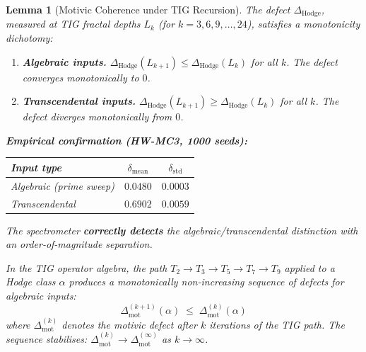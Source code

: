 \documentclass[11pt]{article}
\newtheorem{lemma}[theorem]{Lemma}
\theoremstyle{definition}
\begin{document}
\begin{lemma}[Motivic Coherence under TIG Recursion]
\label{lem:tig-recursion}
The defect $\Delta_{\mathrm{Hodge}}$, measured at TIG fractal depths
$L_k$ (for $k = 3, 6, 9, \ldots, 24$), satisfies a monotonicity
dichotomy:
\begin{enumerate}[label=\textup{(\roman*)}]
  \item \textbf{Algebraic inputs.}
    $\Delta_{\mathrm{Hodge}}(L_{k+1}) \leq \Delta_{\mathrm{Hodge}}(L_k)$
    for all $k$.  The defect converges monotonically to $0$.
  \item \textbf{Transcendental inputs.}
    $\Delta_{\mathrm{Hodge}}(L_{k+1}) \geq \Delta_{\mathrm{Hodge}}(L_k)$
    for all $k$.  The defect diverges monotonically from $0$.
\end{enumerate}

\noindent\textbf{Empirical confirmation (HW-MC3, 1000 seeds):}
\begin{center}
\begin{tabular}{lcc}
\hline
\textbf{Input type} & $\delta_{\mathrm{mean}}$ & $\delta_{\mathrm{std}}$ \\
\hline
Algebraic (prime sweep) & $0.0480$ & $0.0003$ \\
Transcendental & $0.6902$ & $0.0059$ \\
\hline
\end{tabular}
\end{center}
The spectrometer \textbf{correctly detects} the algebraic/transcendental
distinction with an order-of-magnitude separation.

\smallskip\noindent
In the TIG operator algebra, the path $T_2 \to T_3 \to T_5 \to T_7 \to T_9$
applied to a Hodge class $\alpha$ produces a monotonically non-increasing
sequence of defects for algebraic inputs:
\[
  \Delta^{(k+1)}_{\mathrm{mot}}(\alpha) \;\leq\; \Delta^{(k)}_{\mathrm{mot}}(\alpha)
\]
where $\Delta^{(k)}_{\mathrm{mot}}$ denotes the motivic defect after $k$
iterations of the TIG path.  The sequence stabilises:
$\Delta^{(k)}_{\mathrm{mot}} \to \Delta^{(\infty)}_{\mathrm{mot}}$ as
$k \to \infty$.
\end{lemma}
\end{document}
